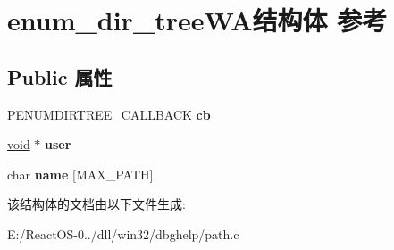 \hypertarget{structenum__dir__tree_w_a}{}\section{enum\+\_\+dir\+\_\+tree\+W\+A结构体 参考}
\label{structenum__dir__tree_w_a}
\subsection*{Public 属性}
\begin{DoxyCompactItemize}
\item 
\mbox{\label{structenum__dir__tree_w_a_a51de22f434c020c6927a4707c6c8d84d}} 
P\+E\+N\+U\+M\+D\+I\+R\+T\+R\+E\+E\+\_\+\+C\+A\+L\+L\+B\+A\+CK {\bfseries cb}
\item 
\mbox{\label{structenum__dir__tree_w_a_af83d53e7e9523de2f0dcd469c2570208}} 
\hyperlink{interfacevoid}{void} $\ast$ {\bfseries user}
\item 
\mbox{\label{structenum__dir__tree_w_a_aae36015a266a274b5c68051244f4b0f9}} 
char {\bfseries name} \mbox{[}M\+A\+X\+\_\+\+P\+A\+TH\mbox{]}
\end{DoxyCompactItemize}


该结构体的文档由以下文件生成\+:\begin{DoxyCompactItemize}
\item 
E\+:/\+React\+O\+S-\/0../dll/win32/dbghelp/path.\+c\end{DoxyCompactItemize}
